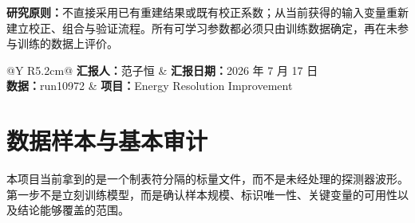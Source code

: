 \documentclass[UTF8,11pt,a4paper,oneside,fontset=none]{ctexart}
\begin{document}
\vspace{0.45cm}
\begin{keybox}
\textbf{研究原则：}不直接采用已有重建结果或既有校正系数；从当前获得的输入变量重新建立校正、组合与验证流程。所有可学习参数都必须只由训练数据确定，再在未参与训练的数据上评价。
\end{keybox}

\vfill
\begin{tabularx}{\textwidth}{@{}Y R{5.2cm}@{}}
\textbf{汇报人：}范子恒 & \textbf{汇报日期：}2026 年 7 月 17 日\\
\textbf{数据：}run10972 & \textbf{项目：}Energy Resolution Improvement
\end{tabularx}

\vspace{0.35cm}
\noindent{\color{PandaTeal}\rule{\textwidth}{1.3pt}}
\clearpage

\section{数据样本与基本审计}

本项目当前拿到的是一个制表符分隔的标量文件，而不是未经处理的探测器波形。第一步不是立刻训练模型，而是确认样本规模、标识唯一性、关键变量的可用性以及结论能够覆盖的范围。
\end{document}
